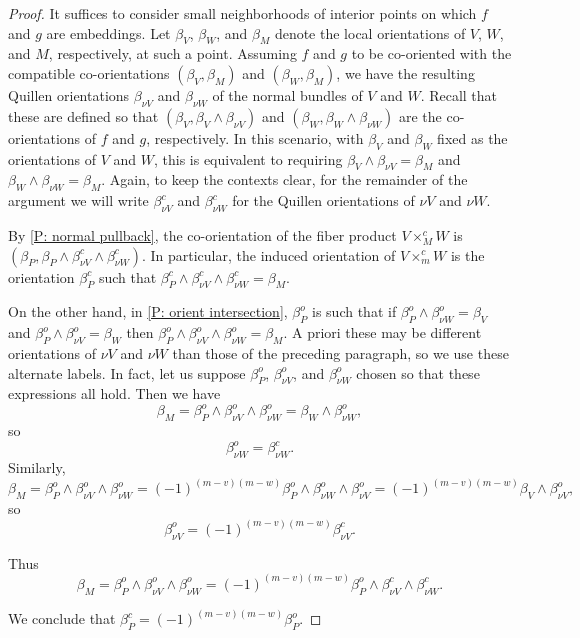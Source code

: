 \begin{proof}
	It suffices to consider small neighborhoods of interior points on which $f$ and $g$ are embeddings.
	Let $\beta_V$, $\beta_W$, and $\beta_M$ denote the local orientations of $V$, $W$, and $M$, respectively, at such a point.
	Assuming $f$ and $g$ to be co-oriented with the compatible co-orientations $(\beta_V,\beta_M)$ and $(\beta_W,\beta_M)$, we have the resulting Quillen orientations $\beta_{\nu V}$ and $\beta_{\nu W}$ of the normal bundles of $V$ and $W$.
	Recall that these are defined so that $(\beta_V,\beta_V \wedge \beta_{\nu V})$ and $(\beta_W,\beta_W \wedge \beta_{\nu W})$ are the co-orientations of $f$ and $g$, respectively.
	In this scenario, with $\beta_V$ and $\beta_W$ fixed as the orientations of $V$ and $W$, this is equivalent to requiring $\beta_V \wedge \beta_{\nu V} = \beta_M$ and $\beta_W \wedge \beta_{\nu W} = \beta_M$.
	Again, to keep the contexts clear, for the remainder of the argument we will write $\beta^c_{\nu V}$ and $\beta^c_{\nu W}$ for the Quillen orientations of $\nu V$ and $\nu W$.

	By \cref{P: normal pullback}, the co-orientation of the fiber product $V \times_M^c W$ is $(\beta_P,\beta_P \wedge \beta^c_{\nu V} \wedge \beta^c_{\nu W})$.
	In particular, the induced orientation of $V\times_m^c W$ is the orientation $\beta_P^c$ such that $\beta_P^c \wedge \beta^c_{\nu V} \wedge \beta^c_{\nu W} = \beta_M$.

	On the other hand, in \cref{P: orient intersection}, $\beta^o_P$ is such that if $\beta^o_P \wedge \beta^o_{\nu W} = \beta_V$ and $\beta^o_P \wedge \beta^o_{\nu V} = \beta_W$ then $\beta^o_P \wedge \beta^o_{\nu V} \wedge \beta^o_{\nu W} = \beta_M.$ A priori these may be different orientations of $\nu V$ and $\nu W$ than those of the preceding paragraph, so we use these alternate labels.
	In fact, let us suppose $\beta^o_P$, $\beta^o_{\nu V}$, and $\beta^o_{\nu W}$ chosen so that these expressions all hold.
	Then we have
	$$\beta_M = \beta^o_P \wedge \beta^o_{\nu V} \wedge \beta^o_{\nu W} = \beta_{W} \wedge \beta^o_{\nu W},$$
	so
	$$\beta_{\nu W}^o = \beta_{\nu W}^c.$$
	Similarly,
	$$\beta_M = \beta^o_P \wedge \beta^o_{\nu V} \wedge \beta^o_{\nu W} = (-1)^{(m-v)(m-w)}\beta^o_P \wedge \beta^o_{\nu W} \wedge \beta^o_{\nu V} = (-1)^{(m-v)(m-w)}\beta_V \wedge \beta^o_{\nu V},$$
	so
	$$\beta^o_{\nu V} = (-1)^{(m-v)(m-w)}\beta^c_{\nu V}.$$

	Thus
	$$\beta_M = \beta^o_P \wedge \beta^o_{\nu V} \wedge \beta^o_{\nu W} = (-1)^{(m-v)(m-w)}\beta^o_P \wedge \beta^c_{\nu V} \wedge \beta^c_{\nu W}.$$

	We conclude that $\beta^c_P = (-1)^{(m-v)(m-w)}\beta^o_P$.
\end{proof}

